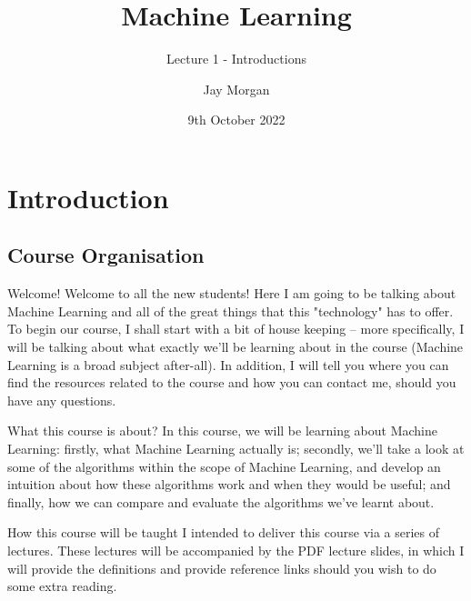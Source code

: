 \documentclass[10pt]{beamer}
\author{Jay Morgan}
\date{9th October 2022}
\title{Machine Learning}
\subtitle{Lecture 1 - Introductions}
\begin{document}
\maketitle

\section*{Introduction}
\label{sec:orgac4a82f}

\subsection*{Course Organisation}
\label{sec:orgab771b7}

\begin{frame}[label={sec:org5dff354}]{Welcome!}
Welcome to all the new students! Here I am going to be talking about Machine Learning
and all of the great things that this "technology" has to offer. To begin our course,
I shall start with a bit of house keeping -- more specifically, I will be talking
about what exactly we'll be learning about in the course (Machine Learning is a broad
subject after-all). In addition, I will tell you where you can find the resources
related to the course and how you can contact me, should you have any questions.
\end{frame}

\begin{frame}[label={sec:orgaf4f4e4}]{What this course is about?}
In this course, we will be learning about Machine Learning: firstly, what Machine
Learning actually is; secondly, we'll take a look at some of the algorithms within
the scope of Machine Learning, and develop an intuition about how these algorithms
work and when they would be useful; and finally, how we can compare and evaluate the
algorithms we've learnt about.
\end{frame}

\begin{frame}[label={sec:org626e08f}]{How this course will be taught}
I intended to deliver this course via a series of lectures. These lectures will be
accompanied by the PDF lecture slides, in which I will provide the definitions and
provide reference links should you wish to do some extra reading.
\end{frame}
\end{document}
